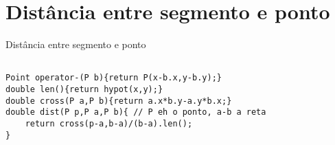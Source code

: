 \section{Distância entre segmento e ponto}
Distância entre segmento e ponto
\begin{multicols}{2}
	\begin{lstlisting}

Point operator-(P b){return P(x-b.x,y-b.y);}
double len(){return hypot(x,y);}
double cross(P a,P b){return a.x*b.y-a.y*b.x;}
double dist(P p,P a,P b){ // P eh o ponto, a-b a reta
	return cross(p-a,b-a)/(b-a).len();
}

\end{lstlisting}
\end{multicols}